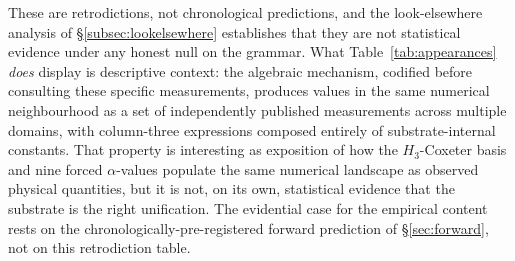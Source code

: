 \documentclass[11pt,a4paper]{amsart}
\theoremstyle{plain}
\theoremstyle{definition}
\begin{document}
These are retrodictions, not chronological predictions, and the look-elsewhere analysis of \S\ref{subsec:lookelsewhere} establishes that they are not statistical evidence under any honest null on the grammar. What Table~\ref{tab:appearances} \emph{does} display is descriptive context: the algebraic mechanism, codified before consulting these specific measurements, produces values in the same numerical neighbourhood as a set of independently published measurements across multiple domains, with column-three expressions composed entirely of substrate-internal constants. That property is interesting as exposition of how the $H_3$-Coxeter basis and nine forced $\alpha$-values populate the same numerical landscape as observed physical quantities, but it is not, on its own, statistical evidence that the substrate is the right unification. The evidential case for the empirical content rests on the chronologically-pre-registered forward prediction of \S\ref{sec:forward}, not on this retrodiction table.
\end{document}
